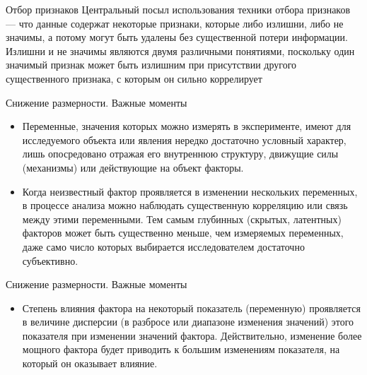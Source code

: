 \documentclass{beamer}
\begin{document}
\begin{frame}{Отбор признаков}
Центральный посыл использования техники отбора признаков — что данные содержат некоторые признаки, которые либо излишни, либо не значимы, а потому могут быть удалены без существенной потери информации. Излишни и не значимы являются двумя различными понятиями, поскольку один значимый признак может быть излишним при присутствии другого существенного признака, с которым он сильно коррелирует


\end{frame}





\begin{frame}{Снижение размерности. Важные моменты}
\begin{itemize}
  \item  Переменные, значения которых можно измерять в эксперименте, имеют для исследуемого объекта или явления нередко достаточно условный характер, лишь опосредовано 
  отражая его внутреннюю структуру, движущие силы (механизмы) или действующие на объект факторы. 
  
  \item Когда неизвестный фактор проявляется в изменении нескольких переменных, в процессе анализа можно наблюдать существенную корреляцию или связь между этими 
  переменными. 
  Тем самым глубинных (скрытых, латентных) факторов может быть существенно меньше, чем измеряемых переменных, даже само число которых выбирается исследователем достаточно 
  субъективно.
\end{itemize} 
 \end{frame}
 
   
\begin{frame}{Снижение размерности. Важные моменты}
\begin{itemize}
  
  
  \item Степень влияния фактора на некоторый показатель (переменную) проявляется в величине дисперсии (в разбросе или диапазоне изменения значений) этого показателя при 
  изменении значений фактора.    Действительно, изменение более мощного фактора будет приводить к большим изменениям показателя, на который он оказывает влияние.

\end{itemize} 
 \end{frame}
 
\end{document}
